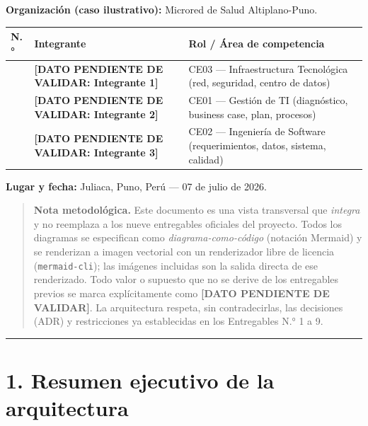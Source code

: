 \documentclass[11pt,a4paper]{article}
\begin{document}
\textbf{Organizaci\'on (caso ilustrativo):} Microred de Salud Altiplano-Puno.

{\small
\begin{longtable}[]{@{}
  >{\raggedright\arraybackslash}p{}
  >{\raggedright\arraybackslash}p{}
  >{\raggedright\arraybackslash}p{}@{}}
\toprule\noalign{}
N.° & Integrante & Rol / \'Area de competencia \\
\midrule\noalign{}
\endhead
\bottomrule\noalign{}
\endlastfoot
1 & \textbf{{[}DATO PENDIENTE DE VALIDAR: Integrante 1{]}} & CE03 --- Infraestructura Tecnol\'ogica (red, seguridad, centro de datos) \\
2 & \textbf{{[}DATO PENDIENTE DE VALIDAR: Integrante 2{]}} & CE01 --- Gesti\'on de TI (diagn\'ostico, business case, plan, procesos) \\
3 & \textbf{{[}DATO PENDIENTE DE VALIDAR: Integrante 3{]}} & CE02 --- Ingenier\'ia de Software (requerimientos, datos, sistema, calidad) \\
\end{longtable}
}

\textbf{Lugar y fecha:} Juliaca, Puno, Per\'u --- 07 de julio de 2026.

\begin{quote}
\textbf{Nota metodol\'ogica.} Este documento es una vista transversal que \emph{integra} y no reemplaza a los nueve entregables oficiales del proyecto. Todos los diagramas se especifican como \emph{diagrama-como-c\'odigo} (notaci\'on Mermaid) y se renderizan a imagen vectorial con un renderizador libre de licencia (\texttt{mermaid-cli}); las im\'agenes incluidas son la salida directa de ese renderizado. Todo valor o supuesto que no se derive de los entregables previos se marca expl\'icitamente como \textbf{{[}DATO PENDIENTE DE VALIDAR{]}}. La arquitectura respeta, sin contradecirlas, las decisiones (ADR) y restricciones ya establecidas en los Entregables N.° 1 a 9.
\end{quote}

\begin{center}\rule{0.5\linewidth}{0.5pt}\end{center}

\section{1. Resumen ejecutivo de la arquitectura}\label{resumen}
\end{document}
